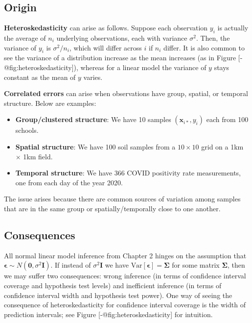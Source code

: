 \documentclass[
  11pt,
  letterpaper,
  oneside]{book}
\providecommand{\tightlist}{%
  \setlength{\itemsep}{0pt}\setlength{\parskip}{0pt}}\usepackage{longtable,booktabs,array}
\theoremstyle{definition}
\theoremstyle{plain}
\theoremstyle{plain}
\theoremstyle{plain}
\theoremstyle{remark}
\begin{document}
\hypertarget{origin-1}{%
\subsection{Origin}\label{origin-1}}

\textbf{Heteroskedasticity} can arise as follows. Suppose each
observation \(y_i\) is actually the average of \(n_i\) underlying
observations, each with variance \(\sigma^2\). Then, the variance of
\(y_i\) is \(\sigma^2/n_i\), which will differ across \(i\) if \(n_i\)
differ. It is also common to see the variance of a distribution increase
as the mean increases (as in Figure {[}-@fig:heteroskedasticity{]}),
whereas for a linear model the variance of \(y\) stays constant as the
mean of \(y\) varies.

\textbf{Correlated errors} can arise when observations have group,
spatial, or temporal structure. Below are examples:

\begin{itemize}
\tightlist
\item
  \textbf{Group/clustered structure}: We have 10 samples
  \((\boldsymbol{x}_{i*}, y_i)\) each from 100 schools.
\item
  \textbf{Spatial structure}: We have 100 soil samples from a
  \(10\times10\) grid on a 1km \(\times\) 1km field.
\item
  \textbf{Temporal structure}: We have 366 COVID positivity rate
  measurements, one from each day of the year 2020.
\end{itemize}

The issue arises because there are common sources of variation among
samples that are in the same group or spatially/temporally close to one
another.

\hypertarget{consequences-1}{%
\subsection{Consequences}\label{consequences-1}}

All normal linear model inference from Chapter 2 hinges on the
assumption that
\(\boldsymbol{\epsilon} \sim N(\boldsymbol{0}, \sigma^2 \boldsymbol{I})\).
If instead of \(\sigma^2 \boldsymbol{I}\) we have
\(\text{Var}[\boldsymbol{\epsilon}] = \boldsymbol{\Sigma}\) for some
matrix \(\boldsymbol{\Sigma}\), then we may suffer two consequences:
wrong inference (in terms of confidence interval coverage and hypothesis
test levels) and inefficient inference (in terms of confidence interval
width and hypothesis test power). One way of seeing the consequence of
heteroskedasticity for confidence interval coverage is the width of
prediction intervals; see Figure {[}-@fig:heteroskedasticity{]} for
intuition.
\end{document}

